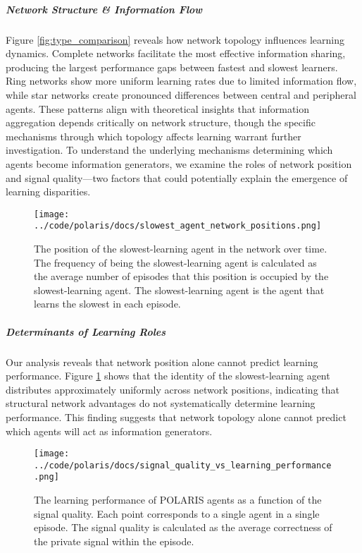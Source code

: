 \subparagraph{Network Structure \& Information Flow} Figure \ref{fig:type_comparison} reveals how network topology influences learning dynamics. Complete networks facilitate the most effective information sharing, producing the largest performance gaps between fastest and slowest learners. Ring networks show more uniform learning rates due to limited information flow, while star networks create pronounced differences between central and peripheral agents. These patterns align with theoretical insights that information aggregation depends critically on network structure, though the specific mechanisms through which topology affects learning warrant further investigation.
\iffalse
To understand the underlying mechanisms determining which agents become information generators, we examine the roles of network position and signal quality—two factors that could potentially explain the emergence of learning disparities.

\begin{figure}[!htbp]
    \centering
    \texttt{[image: ../code/polaris/docs/slowest\_agent\_network\_positions.png]}
    \caption{The position of the slowest-learning agent in the network over time. The frequency of being the slowest-learning agent is calculated as the average number of episodes that this position is occupied by the slowest-learning agent. The slowest-learning agent is the agent that learns the slowest in each episode.}
    \label{fig:slowest_agent_network_positions}
\end{figure}

\subparagraph{Determinants of Learning Roles} Our analysis reveals that network position alone cannot predict learning performance. Figure \ref{fig:slowest_agent_network_positions} shows that the identity of the slowest-learning agent distributes approximately uniformly across network positions, indicating that structural network advantages do not systematically determine learning performance. This finding suggests that network topology alone cannot predict which agents will act as information generators.

\begin{figure}[!htbp]
    \centering
    \texttt{[image: ../code/polaris/docs/signal\_quality\_vs\_learning\_performance.png]}
    \caption{The learning performance of POLARIS agents as a function of the signal quality. Each point corresponds to a single agent in a single episode. The signal quality is calculated as the average correctness of the private signal within the episode.}
    \label{fig:signal_quality_vs_learning_performance}
\end{figure}

